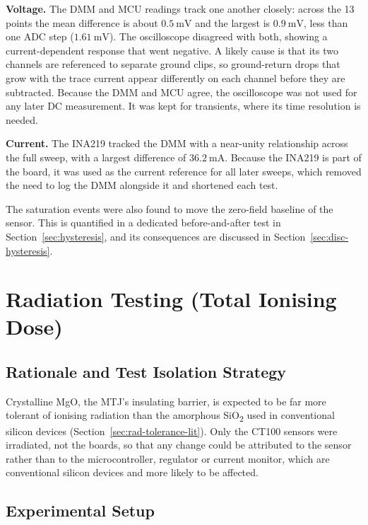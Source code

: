 \documentclass[12pt,a4paper]{article}
\begin{document}
\textbf{Voltage.} The DMM and MCU readings track one another closely: across the 13 points the mean difference is about $\SI{0.5}{\milli\volt}$ and the largest is $\SI{0.9}{\milli\volt}$, less than one ADC step ($\SI{1.61}{\milli\volt}$). The oscilloscope disagreed with both, showing a current-dependent response that went negative. A likely cause is that its two channels are referenced to separate ground clips, so ground-return drops that grow with the trace current appear differently on each channel before they are subtracted. Because the DMM and MCU agree, the oscilloscope was not used for any later DC measurement. It was kept for transients, where its time resolution is needed.

\textbf{Current.} The INA219 tracked the DMM with a near-unity relationship across the full sweep, with a largest difference of $\SI{36.2}{\milli\ampere}$. Because the INA219 is part of the board, it was used as the current reference for all later sweeps, which removed the need to log the DMM alongside it and shortened each test.

The saturation events were also found to move the zero-field baseline of the sensor. This is quantified in a dedicated before-and-after test in Section~\ref{sec:hysteresis}, and its consequences are discussed in Section~\ref{sec:disc-hysteresis}.



\section{Radiation Testing (Total Ionising Dose)}
\label{sec:radiation-testing}

\subsection{Rationale and Test Isolation Strategy}
\label{sec:rad-rationale}

Crystalline MgO, the MTJ's insulating barrier, is expected to be far more tolerant of ionising radiation than the amorphous SiO\textsubscript{2} used in conventional silicon devices (Section~\ref{sec:rad-tolerance-lit}). Only the CT100 sensors were irradiated, not the boards, so that any change could be attributed to the sensor rather than to the microcontroller, regulator or current monitor, which are conventional silicon devices and more likely to be affected.


\subsection{Experimental Setup}
\label{sec:rad-setup}
\end{document}
